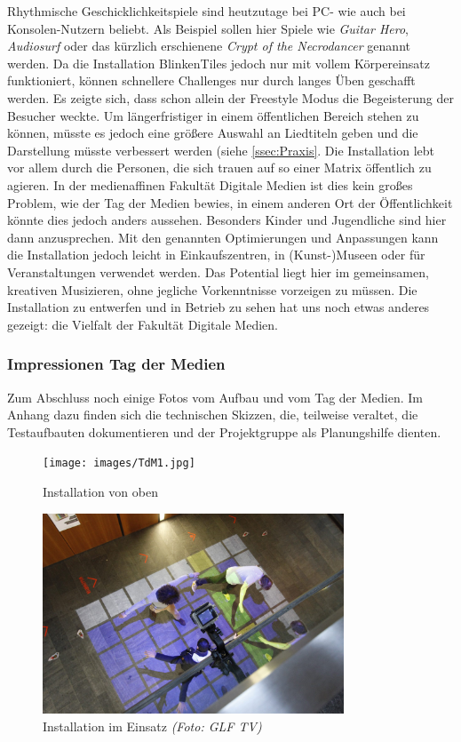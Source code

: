 
Rhythmische Geschicklichkeitspiele sind heutzutage bei PC- wie auch bei Konsolen-Nutzern beliebt. Als Beispiel sollen hier Spiele wie \textit{Guitar Hero}, \textit{Audiosurf} oder das kürzlich erschienene \textit{Crypt of the Necrodancer} genannt werden. Da die Installation BlinkenTiles jedoch nur mit vollem Körpereinsatz funktioniert, können schnellere Challenges nur durch langes Üben geschafft werden. Es zeigte sich, dass schon allein der Freestyle Modus die Begeisterung der Besucher weckte. Um längerfristiger in einem öffentlichen Bereich stehen zu können, müsste es jedoch eine größere Auswahl an Liedtiteln geben und die Darstellung müsste verbessert werden (siehe \autoref{ssec:Praxis}. Die Installation lebt vor allem durch die Personen, die sich trauen auf so einer Matrix öffentlich zu agieren. In der medienaffinen Fakultät Digitale Medien ist dies kein großes Problem, wie der Tag der Medien bewies, in einem anderen Ort der Öffentlichkeit könnte dies jedoch anders aussehen. Besonders Kinder und Jugendliche sind hier dann anzusprechen. Mit den genannten Optimierungen und Anpassungen kann die Installation jedoch leicht in Einkaufszentren, in (Kunst-)Museen oder für Veranstaltungen verwendet werden. Das Potential liegt hier im gemeinsamen, kreativen Musizieren, ohne jegliche Vorkenntnisse vorzeigen zu müssen. Die Installation zu entwerfen und in Betrieb zu sehen hat uns noch etwas anderes gezeigt: die Vielfalt der Fakultät Digitale Medien.

\subsubsection{Impressionen Tag der Medien}
Zum Abschluss noch einige Fotos vom Aufbau und vom Tag der Medien. Im Anhang dazu finden sich die technischen Skizzen, die, teilweise veraltet, die Testaufbauten dokumentieren und der Projektgruppe als Planungshilfe dienten.

\begin{figure}[htbp]
	\centering
		\texttt{[image: images/TdM1.jpg]}
	\caption{Installation von oben}
	\label{fig:TdM1}
\end{figure}

\begin{figure}[htbp]
	\centering
		\includegraphics[width=0.8\textwidth]{images/TdM5.jpg}
	\caption{Installation im Einsatz \textit{(Foto: GLF TV)}}
	\label{fig:TdM5}
\end{figure}

